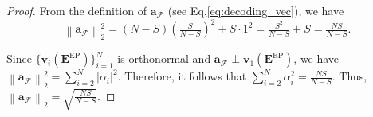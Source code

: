 \documentclass[lettersize,journal]{IEEEtran}
\renewcommand{\v}{\boldsymbol{v}}
\newcommand{\norm}[1]{\left\lVert#1\right\rVert}
\newcommand{\ones}[1]{\boldsymbol{1}_{#1}}
\newcommand{\F}{\mathcal{F}}
\newcommand{\GEP}{\boldsymbol{E}^{\mathrm{EP}}}
\renewcommand{\a}{\boldsymbol{a}}
\begin{document}
{\begin{proof}
From the definition of $\a_\F$ (see Eq.\eqref{eq:decoding_vec}), we have
\[
\norm{\a_\F}_2^2
= (N-S)\left(\tfrac{S}{N-S}\right)^{\!2}
+ S\cdot 1^2
= \tfrac{S^2}{N-S}+S
= \tfrac{NS}{N-S}.
\]

Since $\{\v_i(\GEP)\}_{i=1}^N$ is orthonormal and $\a_\F\perp\v_1(\GEP)$, we have
$\norm{\a_\F}_2^2
= \textstyle\sum_{i=2}^N \bigl|\alpha_i\bigr|^2.$
Therefore, it follows that
$\sum_{i=2}^N \alpha_i^2=\tfrac{NS}{N-S}$. Thus,
$\norm{\a_\F}_2=\sqrt{\tfrac{NS}{N-S}}$.
\end{proof}




}
\end{document}

